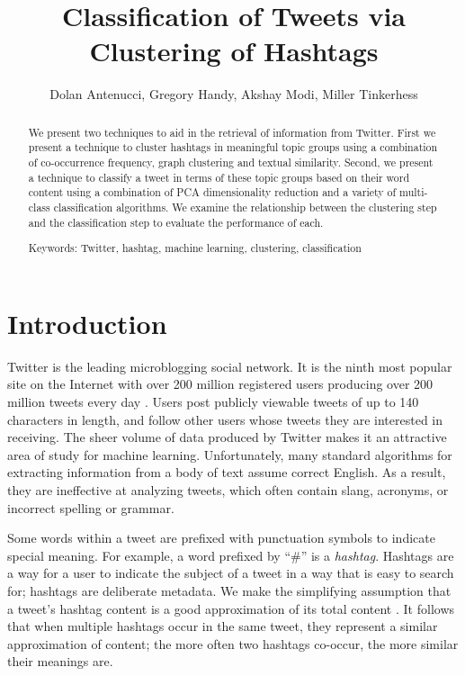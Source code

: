 
\begin{abstract}
We present two techniques to aid in the retrieval of information from Twitter. First we present a technique to cluster hashtags in meaningful topic groups using a combination of co-occurrence frequency, graph clustering and textual similarity. Second, we present a technique to classify a tweet in terms of these topic groups based on their word content using a combination of PCA dimensionality reduction and a variety of multi-class classification algorithms. We examine the relationship between the clustering step and the classification step to evaluate the performance of each.

Keywords: Twitter, hashtag, machine learning, clustering, classification
\end{abstract}


\title{Classification of Tweets via Clustering of Hashtags}
\author{Dolan Antenucci, Gregory Handy, Akshay Modi, Miller Tinkerhess} 

\maketitle


\section{Introduction}
Twitter is the leading microblogging social network. It is the ninth most popular site on the Internet with over 200 million registered users producing over 200 million tweets every day \cite{Shiels2011,Alexa2011,Twitter.com2011}. Users post publicly viewable tweets of up to 140 characters in length, and follow other users whose tweets they are interested in receiving. The sheer volume of data produced by Twitter makes it an attractive area of study for machine learning. Unfortunately, many standard algorithms for extracting information from a body of text assume correct English. As a result, they are ineffective at analyzing tweets, which often contain slang, acronyms, or incorrect spelling or grammar.

Some words within a tweet are prefixed with punctuation symbols to indicate special meaning. For example, a word prefixed by ``$\#$'' is a {\it hashtag}. Hashtags are a way for a user to indicate the subject of a tweet in a way that is easy to search for; hashtags are deliberate metadata. We make the simplifying assumption that a tweet's hashtag content is a good approximation of its total content \cite{Rosa2011}. It follows that when multiple hashtags occur in the same tweet, they represent a similar approximation of content; the more often two hashtags co-occur, the more similar their meanings are.

